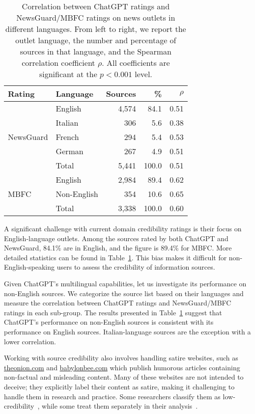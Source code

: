 \documentclass{article}
\begin{document}
\begin{table}
\centering
\caption{
Correlation between ChatGPT ratings and NewsGuard/MBFC ratings on news outlets in different languages.
From left to right, we report the outlet language, the number and percentage of sources in that language, and the Spearman correlation coefficient $\rho$.
All coefficients are significant at the $p<0.001$ level.
}
\label{table:language}
\begin{tabular}{l|lrrr}
\hline
Rating & Language & Sources & \% & $\rho$  \\
\hline
\multirow{5}{5em}{NewsGuard} & English & 4,574 & 84.1 & 0.51 \\
& Italian & 306 & 5.6  & 0.38 \\
& French & 294 & 5.4 & 0.53 \\
& German & 267 & 4.9 & 0.51 \\
& Total & 5,441 & 100.0 & 0.51 \\
\hline
\multirow{3}{5em}{MBFC} & English & 2,984 & 89.4 & 0.62 \\
& Non-English & 354 & 10.6 & 0.65 \\
& Total & 3,338 & 100.0 & 0.60\\
\hline
\end{tabular}%
\end{table}

A significant challenge with current domain credibility ratings is their focus on English-language outlets.
Among the sources rated by both ChatGPT and NewsGuard, 84.1\% are in English, and the figure is 89.4\% for MBFC.
More detailed statistics can be found in Table~\ref{table:language}.
This bias makes it difficult for non-English-speaking users to assess the credibility of information sources.

Given ChatGPT's multilingual capabilities, let us investigate its performance on non-English sources.
We categorize the source list based on their languages and measure the correlation between ChatGPT ratings and NewsGuard/MBFC ratings in each sub-group.
The results presented in Table~\ref{table:language} suggest that ChatGPT's performance on non-English sources is consistent with its performance on English sources.
Italian-language sources are the exception with a lower correlation.

Working with source credibility also involves handling satire websites, such as \url{theonion.com} and \url{babylonbee.com} which publish humorous articles containing non-factual and misleading content.
Many of these websites are not intended to deceive; they explicitly label their content as satire, making it challenging to handle them in research and practice.
Some researchers classify them as low-credibility~\cite{shao_spread_2018}, while some treat them separately in their analysis~\cite{grinberg2019fake}.
\end{document}
